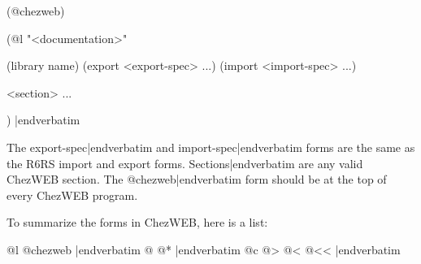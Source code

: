 \medskip\verbatim
(@chezweb)

(@l "<documentation>"

(library name)
(export <export-spec> ...)
(import <import-spec> ...)

<section> ...

)
|endverbatim
\medskip

\noindent
The 
\verbatim export-spec|endverbatim 
and 
\verbatim import-spec|endverbatim 
forms are the same as the R6RS import and
export forms.  
\verbatim Sections|endverbatim 
are any valid ChezWEB
section.  The 
\verbatim @chezweb|endverbatim 
form should be at the top
of every ChezWEB program.

To summarize the forms in ChezWEB, here is a list:

\medskip
{}
\verbatim @l @chezweb |endverbatim
\verbatim @ @* |endverbatim
\verbatim @c @> @< @<< |endverbatim
\medskip

\noindent


\bye
